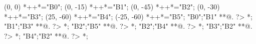 \documentclass[landscape]{article}
\begin{document}

\clearpage


\clearpage


\clearpage


\clearpage


\clearpage


\clearpage


\clearpage


\clearpage


\clearpage

\begin{scriptsize}
\xy(0, 0)
	*++{}*\frm{-,}="B0";
(0, -15)
	*++{}*\frm{-,}="B1";
(0, -45)
	*++{}*\frm{-,}="B2";
(0, -30)
	*++{}*\frm{-,}="B3";
(25, -60)
	*++{}*\frm{-,}="B4";
(-25, -60)
	*++{}*\frm{-,}="B5";
"B0";"B1" **@{.} ?> *{\dir{>}};
"B1";"B3" **@{.} ?> *{\dir{>}};
"B2";"B5" **@{.} ?> *{\dir{>}};
"B2";"B4" **@{.} ?> *{\dir{>}};
"B3";"B2" **@{.} ?> *{\dir{>}};
"B4";"B2" **@{.} ?> *{\dir{>}};
\endxy
\end{scriptsize}
\end{document}
